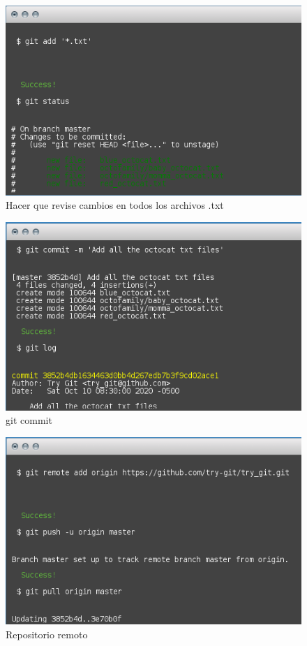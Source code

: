 \documentclass[11pt]{article}
\begin{document}
\begin{figure}[H]
	\centering
	\includegraphics[scale=0.8]{git_5.png}
	\caption{Hacer que revise cambios en todos los archivos .txt}
	\label{fig:c5}
\end{figure}

\begin{figure}[H]
	\centering
	\includegraphics[scale=0.8]{git_6.png}
	\caption{git commit}
	\label{fig:c6}
\end{figure}

\begin{figure}[H]
	\centering
	\includegraphics[scale=0.8]{git_7.png}
	\caption{Repositorio remoto}
	\label{fig:c7}
\end{figure}
\end{document}
